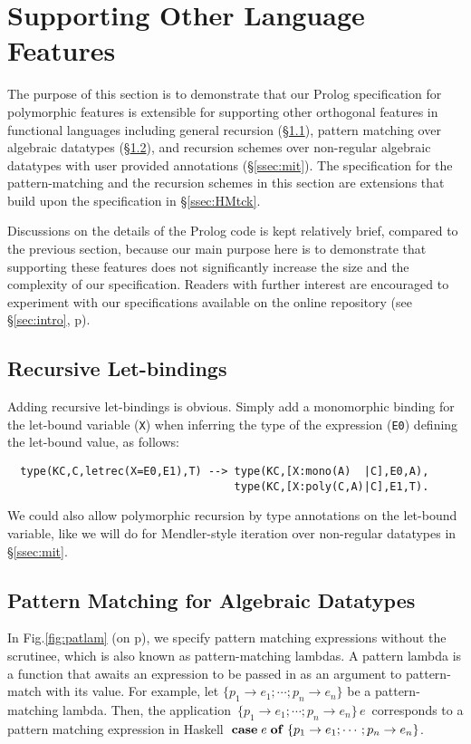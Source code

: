 \documentclass[runningheads,a4paper]{llncs}
\begin{document}
\section{Supporting Other Language Features}\label{sec:other}
The purpose of this section is to demonstrate that our Prolog specification
for polymorphic features is extensible for supporting other orthogonal
features in functional languages including general recursion
(\S\ref{ssec:letrec}), pattern matching over algebraic datatypes
(\S\ref{ssec:patlam}), and recursion schemes over non-regular
algebraic datatypes with user provided annotations (\S\ref{ssec:mit}).
The specification for the pattern-matching and the recursion schemes
in this section are extensions that build upon the specification
in \S\ref{ssec:HMtck}.

Discussions on the details of the Prolog code is kept relatively brief,
compared to the previous section, because our main purpose here is to
demonstrate that supporting these features does not significantly increase
the size and the complexity of our specification. Readers with further
interest are encouraged to experiment with our specifications available
on the online repository (see \S\ref{sec:intro}, p\pageref{githubURL}).

\subsection{Recursive Let-bindings}\label{ssec:letrec}
Adding recursive let-bindings is obvious. Simply add
a monomorphic binding for the let-bound variable (\verb|X|)
when inferring the type of the expression (\verb|E0|) defining
the let-bound value, as follows:
{\small
\begin{verbatim}
  type(KC,C,letrec(X=E0,E1),T) --> type(KC,[X:mono(A)  |C],E0,A),
                                   type(KC,[X:poly(C,A)|C],E1,T).
\end{verbatim} }

We could also allow polymorphic recursion by type annotations
on the let-bound variable, like we will do for Mendler-style iteration
over non-regular datatypes in \S\ref{ssec:mit}.


\subsection{Pattern Matching for Algebraic Datatypes}\label{ssec:patlam}
In Fig.\ref{fig:patlam} (on p\pageref{fig:patlam}), we specify
pattern matching expressions without the scrutinee, which is
also known as pattern-matching lambdas. A pattern lambda is
a function that awaits an expression to be passed in
as an argument to pattern-match with its value. For example,
let $\{p_1\to e_1;\cdots; p_n\to e_n\}$ be a pattern-matching lambda.
Then, the application $\,\{p_1\to e_1;\cdots; p_n\to e_n\}\,e\,$
corresponds to a pattern matching expression in Haskell
${\bf\;case}\;e\;{\bf of}\;\{p_1\to e_1;\cdots; p_n\to e_n\}$.
\end{document}
